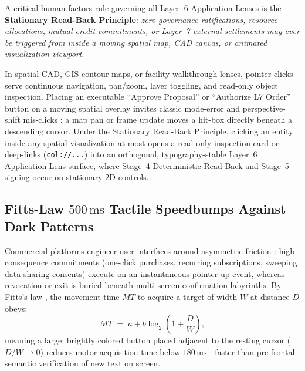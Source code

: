 A critical human-factors rule governing all Layer~6 Application Lenses is the \textbf{Stationary Read-Back Principle}: \emph{zero governance ratifications, resource allocations, mutual-credit commitments, or Layer~7 external settlements may ever be triggered from inside a moving spatial map, CAD canvas, or animated visualization viewport}.

In spatial CAD, GIS contour maps, or facility walkthrough lenses, pointer clicks serve continuous navigation, pan/zoom, layer toggling, and read-only object inspection. Placing an executable ``Approve Proposal'' or ``Authorize L7 Order'' button on a moving spatial overlay invites classic mode-error and perspective-shift mis-clicks \parencite{norman2013design}: a map pan or frame update moves a hit-box directly beneath a descending cursor. Under the Stationary Read-Back Principle, clicking an entity inside any spatial visualization at most opens a read-only inspection card or deep-links (\texttt{col://...}) into an orthogonal, typography-stable Layer~6 Application Lens surface, where Stage~4 Deterministic Read-Back and Stage~5 signing occur on stationary 2D controls.

\subsection{Fitts-Law $500\,\mathrm{ms}$ Tactile Speedbumps Against Dark Patterns}
\label{subsec:fitts-speedbumps}

Commercial platforms engineer user interfaces around asymmetric friction \parencite{gray2018darkpatterns}: high-consequence commitments (one-click purchases, recurring subscriptions, sweeping data-sharing consents) execute on an instantaneous pointer-up event, whereas revocation or exit is buried beneath multi-screen confirmation labyrinths. By Fitts's law \parencite{fitts1954information}, the movement time $MT$ to acquire a target of width $W$ at distance $D$ obeys:
\begin{equation}
\label{eq:fitts-law}
MT \;=\; a + b \log_2\!\left(1 + \frac{D}{W}\right),
\end{equation}
meaning a large, brightly colored button placed adjacent to the resting cursor ($D/W \to 0$) reduces motor acquisition time below $180\,\mathrm{ms}$---faster than pre-frontal semantic verification of new text on screen.

